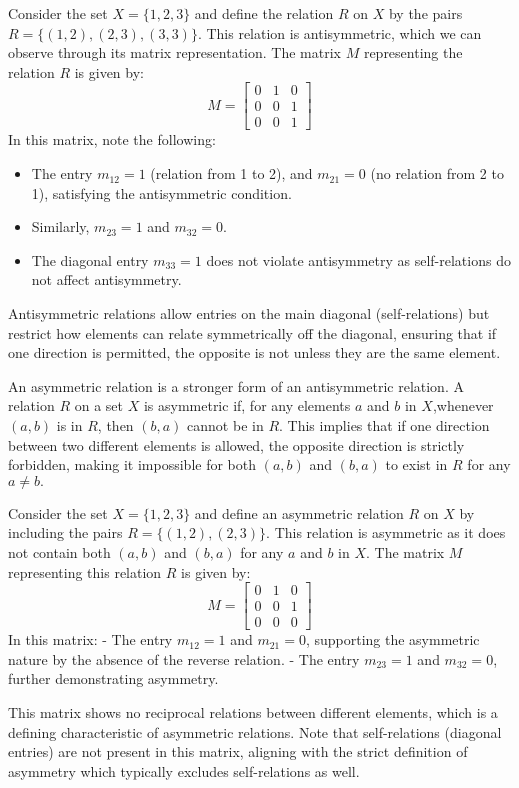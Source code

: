 	\begin{example}[Antisymmetry]
		Consider the set \( X = \{1, 2, 3\} \) and define the relation \( R \) on \( X \) by the pairs \( R = \{(1, 2), (2, 3), (3, 3)\} \). This relation is antisymmetric, which we can observe through its matrix representation. The matrix \( M \) representing the relation \( R \) is given by:
		$$
		M = \begin{bmatrix}
			0 & 1 & 0 \\
			0 & 0 & 1 \\
			0 & 0 & 1
		\end{bmatrix}
		$$
		In this matrix, note the following:
		\begin{itemize}
		\item The entry \( m_{12} = 1 \) (relation from 1 to 2), and \( m_{21} = 0 \) (no relation from 2 to 1), satisfying the antisymmetric condition.
		\item Similarly, \( m_{23} = 1 \) and \( m_{32} = 0 \).
		\item The diagonal entry \( m_{33} = 1 \) does not violate antisymmetry as self-relations do not affect antisymmetry.
		\end{itemize}
		Antisymmetric relations allow entries on the main diagonal (self-relations) but restrict how elements can relate symmetrically off the diagonal, ensuring that if one direction is permitted, the opposite is not unless they are the same element.
	\end{example}
	An asymmetric relation is a stronger form of an antisymmetric relation. A relation $R$ on a set $X$ is asymmetric if, for any elements $a$ and $b$ in $X$,whenever $(a,b)$ is in $R$, then $(b,a)$ cannot be in $R$. This implies that if one direction between two different elements is allowed, the opposite direction is strictly forbidden, making it impossible for both $(a,b)$ and $(b,a)$ to exist in $R$ for any $a\neq b.$
	\begin{example}[Asymmetry]
		Consider the set \( X = \{1, 2, 3\} \) and define an asymmetric relation \( R \) on \( X \) by including the pairs \( R = \{(1, 2), (2, 3)\} \). This relation is asymmetric as it does not contain both \( (a, b) \) and \( (b, a) \) for any \( a \) and \( b \) in \( X \). The matrix \( M \) representing this relation \( R \) is given by:
		\[
		M = \begin{bmatrix}
			0 & 1 & 0 \\
			0 & 0 & 1 \\
			0 & 0 & 0
		\end{bmatrix}
		\]
		In this matrix:
		- The entry \( m_{12} = 1 \) and \( m_{21} = 0 \), supporting the asymmetric nature by the absence of the reverse relation.
		- The entry \( m_{23} = 1 \) and \( m_{32} = 0 \), further demonstrating asymmetry.
		
		This matrix shows no reciprocal relations between different elements, which is a defining characteristic of asymmetric relations. Note that self-relations (diagonal entries) are not present in this matrix, aligning with the strict definition of asymmetry which typically excludes self-relations as well.
	\end{example}

